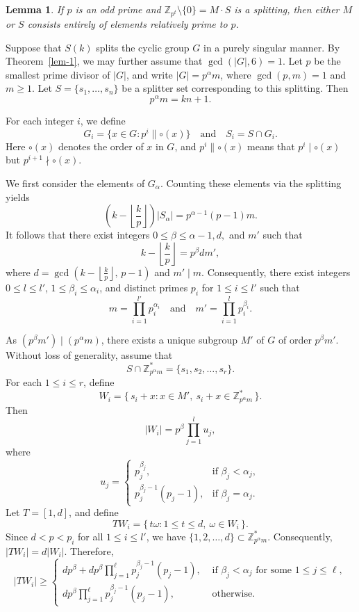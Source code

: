 \documentclass[12pt]{article}
\newtheorem{lemma}[theorem]{Lemma}
\begin{document}
\begin{lemma}\cite{S87}\label{lemma-1}
If $p$ is an odd prime and $\mathbb{Z}_{p^t}\setminus\{0\}=M\cdot S$ is a splitting, then either $M$ or $S$ consists entirely of elements relatively prime to $p$.
\end{lemma}

Suppose that \(S(k)\) splits the cyclic group \(G\) in a purely singular manner. By Theorem~\ref{lem-1}, we may further assume that $\gcd(|G|,6)=1$. Let \(p\) be the smallest prime divisor of \(|G|\), and write \(|G| = p^\alpha m\), where \(\gcd(p,m)=1\) and \(m \ge 1\). Let \(S=\{s_1,\dots,s_n\}\) be a splitter set corresponding to this splitting. Then
\[
p^\alpha m = kn + 1.
\]

For each integer \(i\), we define
\[
G_i = \{ x \in G : p^{i} \parallel \circ(x) \} \quad \text{and} \quad S_i = S \cap G_i.
\]
Here \(\circ(x)\) denotes the order of \(x\) in \(G\), and \(p^{i} \parallel \circ(x)\) means that \(p^i \mid \circ(x)\) but \(p^{i+1} \nmid \circ(x)\).

We first consider the elements of \(G_\alpha\). Counting these elements via the splitting yields
\[
\left(k - \left\lfloor \frac{k}{p} \right\rfloor\right) |S_\alpha|
= p^{\alpha-1}(p-1)m.
\]
It follows that there exist integers $0\leq \beta\leq \alpha -1, d,$ and $m'$ such that 
\[
k - \left\lfloor \frac{k}{p} \right\rfloor = p^\beta d m',
\]
where $d = \gcd\!\left(k - \left\lfloor \frac{k}{p} \right\rfloor,\, p-1\right)$ and \(m' \mid m\).
Consequently, there exist integers \(0 \le l \le l'\), \(1\leq \beta_i \le \alpha_i\), and distinct primes $p_i$ for \(1 \le i \le l'\) such that
\[
m = \prod_{i=1}^{l'} p_i^{\alpha_i}
\quad \text{and} \quad
m' = \prod_{i=1}^{l} p_i^{\beta_i}.
\]

As $(p^{\beta}m')\mid(p^{\alpha}m)$, there exists a unique subgroup \(M'\) of \(G\) of order \(p^{\beta}m'\). Without loss of generality, assume that
\[
S \cap \mathbb{Z}_{p^\alpha m}^{*} = \{s_1, s_2, \dots, s_r\}.
\]
For each \(1 \le i \le r\), define
\[
W_i = \{\, s_i + x : x \in M',\ s_i + x \in \mathbb{Z}_{p^\alpha m}^{*} \,\}.
\]
Then
\[
|W_i| = p^{\beta} \prod_{j=1}^{l} u_j,
\]
where
\[
u_j =
\begin{cases}
p_j^{\beta_j}, & \text{if } \beta_j < \alpha_j, \\[4pt]
p_j^{\beta_j - 1}(p_j - 1), & \text{if } \beta_j = \alpha_j.
\end{cases}
\]
Let \(T = [1,d]\), and define
\[T W_i = \{\, t \omega : 1 \le t \le d,\ \omega\in W_i \,\}.\]
Since \(d<p<p_i\) for all \(1\le i\le l'\), we have
$\{1, 2,\ldots, d\}\subset \mathbb{Z}_{p^{\alpha}m}^{*}$. Consequently,
$|TW_i|=d|W_i|$. Therefore,
\begin{equation}\label{ea}
|TW_i|\geq \left\{\begin{array}{ll} dp^{\beta}+ dp^{\beta}\prod_{j=1}^{\ell} p_j^{\beta_j-1}(p_j-1), &  \mbox{ if } \beta_j<\alpha_j\mbox{ for some } 1\leq j\leq \ell,\\
 dp^{\beta}\prod_{j=1}^{\ell} p_j^{\beta_j-1}(p_j-1), & \mbox{ otherwise.}
 \end{array} \right.\end{equation}
\end{document}
